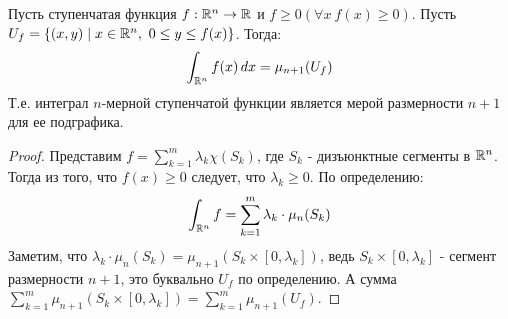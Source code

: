 \begin{statement*}
    Пусть ступенчатая функция $f: \mathbb{R}^n \to \mathbb{R}$ и $f \ge 0 (\forall x \ f(x) \ge 0)$. Пусть $U_f = \{ (x, y) \mid x \in \mathbb{R}^n, \ 0 \le y \le f(x) \}$. Тогда:
    \[\int_{\mathbb{R}^n} f(x) \mathop{}\!d x = \mu_{n+1}(U_f)\]
    Т.е. интеграл $n$-мерной ступенчатой функции является мерой размерности $n+1$ для ее подграфика.
    \begin{proof}
        Представим $f = \sum_{k=1}^{m} \lambda_k \chi(S_k)$, где $S_k$ - дизъюнктные сегменты в $\mathbb{R}^n$. Тогда из того, что $f(x) \ge 0$ следует, что $\lambda_k \ge 0$. По определению:
        \[\int_{\mathbb{R}^n}f = \sum_{k=1}^{m}\lambda_k \cdot \mu_n(S_k)\]
        Заметим, что $\lambda_k \cdot \mu_n(S_k) = \mu_{n+1}(S_k \times [0, \lambda_k])$, ведь $S_k \times [0, \lambda_k]$ - сегмент размерности $n+1$, это буквально $U_f$ по определению.
        А сумма $\sum_{k=1}^{m} \mu_{n+1}(S_k \times [0, \lambda_k]) = \sum_{k=1}^{m}\mu_{n+1}(U_f)$.
    \end{proof}
\end{statement*}

